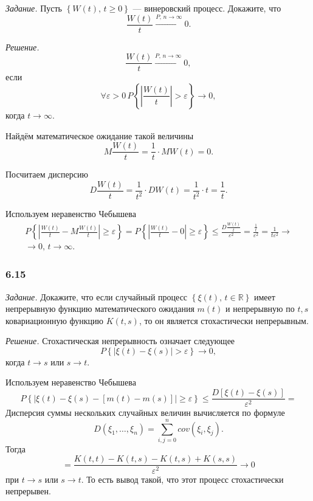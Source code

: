 \textit{Задание.}
Пусть $ \left\{ W \left( t \right), \, t \geq 0 \right\} $ --- винеровский процесс.
Докажите, что
$$ \frac{W \left( t \right) }{t} \overset{P, \, n \to \infty }{ \to }
  0.$$

\textit{Решение.}
$$ \frac{W \left( t \right) }{t} \overset{P, \, n \to \infty }{ \to }
  0,$$
если
$$ \forall \varepsilon > 0 \,
  P \left\{ \left| \frac{W \left( t \right) }{t} \right| > \varepsilon \right\} \to 0,$$
когда $t \to \infty $.

Найдём математическое ожидание такой величины
$$M \frac{W \left( t \right) }{t} =
  \frac{1}{t} \cdot MW \left( t \right) =
  0.$$

Посчитаем дисперсию
$$D \frac{W \left( t \right) }{t} =
  \frac{1}{t^2} \cdot DW \left( t \right) =
  \frac{1}{t^2} \cdot t =
  \frac{1}{t}.$$

Используем неравенство Чебышева
\begin{gather*}
  P \left\{
    \left| \frac{W \left( t \right) }{t} - M \frac{W \left( t \right) }{t} \right| \geq \varepsilon
  \right\} =
  P \left\{ \left| \frac{W \left( t \right) }{t} - 0 \right| \geq \varepsilon \right\} \leq
  \frac{D \frac{W \left( t \right) }{t}}{ \varepsilon^2} =
  \frac{ \frac{1}{t}}{ \varepsilon^2} =
  \frac{1}{t \varepsilon^2} \to \\
  \to 0, \,
  t \to \infty.
\end{gather*}

\subsubsection*{6.15}

\textit{Задание.}
Докажите, что если случайный процесс $ \left\{ \xi \left( t \right), \, t \in \mathbb{R} \right\} $
имеет непрерывную функцию математического ожидания $m \left( t \right) $ и непрерывную по $t, s$
ковариационную функцию $K \left( t, s \right) $, то он является стохастически непрерывным.

\textit{Решение.}
Стохастическая непрерывность означает следующее
$$P \left\{ \left| \xi \left( t \right) - \xi \left( s \right) \right| > \varepsilon \right\} \to
  0,$$
когда $t \to s$ или $s \to t$.

Используем неравенство Чебышева
$$P \left\{
    \left|
      \xi \left( t \right) - \xi \left( s \right) -
      \left[ m \left( t \right) - m \left( s \right) \right] \right| \geq \varepsilon \right\} \leq
  \frac{D \left[ \xi \left( t \right) - \xi \left( s \right) \right] }{ \varepsilon^2} =$$
Дисперсия суммы нескольких случайных величин вычисляется по формуле
$$D \left( \xi_1, \dotsc, \xi_n \right) =
  \sum \limits_{i, j = 0}^n cov \left( \xi_i, \xi_j \right).$$
Тогда
$$= \frac{K \left( t, t \right) - K \left( t, s \right) - K \left( t, s \right) + K \left( s, s \right) }{ \varepsilon^2} \to
  0$$
при $t \to s$ или $s \to t$.
То есть вывод такой, что этот процесс стохастически непрерывен.

